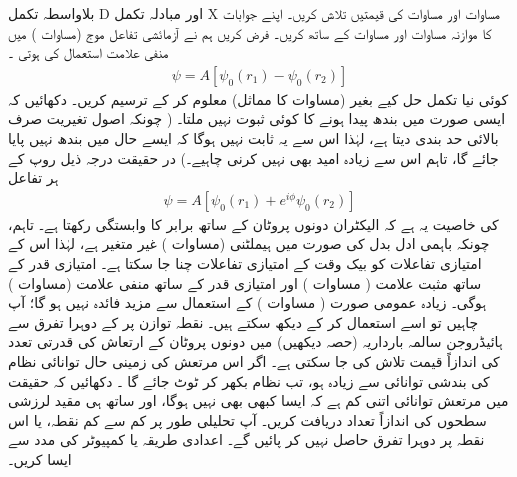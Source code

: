  
بلاواسطہ تکمل D اور مبادلہ تکمل X مساوات   اور مساوات   کی قیمتیں تلاش کریں۔ اپنے جوابات کا موازنہ مساوات   اور  مساوات   کے ساتھ کریں۔ 
فرض کریں ہم نے آزمائشی تفاعل موج  (مساوات  ) میں منفی علامت استعمال کی ہوتی ۔
\begin{align}\label{مساوات_تغیریت_منفی_علامت_آزمائشی}
\psi=A[\psi_{0}(r_{1})-\psi_{0}(r_{2})]
\end{align}
 کوئی نیا تکمل حل کیے بغیر  (مساوات    کا مماثل)   معلوم کر کے ترسیم کریں۔ دکھائیں کہ ایسی صورت میں بندھ   پیدا ہونے کا کوئی ثبوت  نہیں ملتا۔   ( چونکہ اصول تغیریت صرف بالائی حد بندی دیتا ہے،  لہٰذا اس سے یہ ثابت نہیں ہوگا کہ ایسے حال میں بندھ نہیں پایا جائے گا،  تاہم اس سے زیادہ امید بھی نہیں کرنی چاہیے۔)   در حقیقت درجہ ذیل روپ کے ہر  تفاعل 
\begin{align}\label{مساوات_تغیریت_ہر_تفاعل}
\psi=A[\psi_{0}(r_{1})+e^{i\phi}\psi_{0}(r_{2})]
\end{align}
 کی  خاصیت یہ ہے کہ الیکٹران دونوں پروٹان کے ساتھ برابر کا وابستگی رکھتا ہے۔ تاہم،  چونکہ باہمی ادل بدل   کی صورت میں ہیملٹنی  (مساوات  )   غیر متغیر ہے،  لہٰذا اس کے امتیازی تفاعلات کو بیک وقت   کے امتیازی تفاعلات چنا جا سکتا ہے۔ امتیازی قدر  کے ساتھ مثبت علامت
 ( مساوات )  اور امتیازی قدر  کے ساتھ منفی علامت  (مساوات  )   ہوگی۔ زیادہ عمومی صورت ( مساوات  )  کے استعمال سے  مزید فائدہ نہیں ہو گا؛   آپ چاہیں تو اسے استعمال کر کے دیکھ سکتے ہیں۔ 
نقطہ توازن پر   کے  دوہرا   تفرق سے ہائیڈروجن سالمہ بارداریہ  (حصہ   دیکھیں) میں دونوں پروٹان کے  ارتعاش کی قدرتی تعدد   کی اندازاً قیمت تلاش کی جا سکتی ہے۔ اگر اس   مرتعش کی زمینی حال توانائی     نظام کی بندشی توانائی سے زیادہ ہو، تب نظام بکھر کر ٹوٹ جائے گا ۔ دکھائیں کہ حقیقت میں  مرتعش توانائی اتنی کم ہے کہ ایسا کبھی بھی نہیں ہوگا، اور ساتھ ہی مقید لرزشی سطحوں کی اندازاً  تعداد  دریافت کریں۔   آپ   تحلیلی  طور پر کم سے کم نقطہ،  یا اس نقطہ پر دوہرا تفرق حاصل نہیں کر پائیں گے۔ اعدادی طریقہ یا کمپیوٹر کی مدد سے ایسا کریں۔

